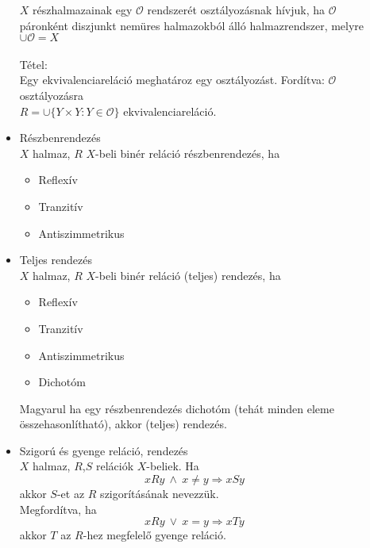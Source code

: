 \documentclass[margin=0px]{article}
\begin{document}
\begin{description}
\begin{itemize}
                  $X$ részhalmazainak egy $\mathcal{O}$ rendszerét osztályozásnak hívjuk, ha $\mathcal{O}$ páronként diszjunkt nemüres halmazokból álló halmazrendszer, melyre $\cup\mathcal{O} = X$
                  \\\\
                  Tétel: \\
                  Egy ekvivalenciareláció meghatároz egy osztályozást. Fordítva: $\mathcal{O}$ osztályozásra \\ ${R = \cup\{Y\times Y : Y \in \mathcal{O} \}}$ ekvivalenciareláció.

            \item Részbenrendezés\\
                  $X$ halmaz, $R$ $X$-beli binér reláció részbenrendezés, ha
                  \begin{itemize}
                      \item Reflexív
                      \item Tranzitív
                      \item Antiszimmetrikus
                  \end{itemize}
            \item Teljes rendezés \\
                  $X$ halmaz, $R$ $X$-beli binér reláció (teljes) rendezés, ha
                  \begin{itemize}
                      \item Reflexív
                      \item Tranzitív
                      \item Antiszimmetrikus
                      \item Dichotóm
                  \end{itemize}
                  Magyarul ha egy részbenrendezés dichotóm (tehát minden eleme összehasonlítható), akkor (teljes) rendezés.
            \item Szigorú és gyenge reláció, rendezés \\
                  $X$ halmaz, $R$,$S$ relációk $X$-beliek. Ha
                  \[ xRy \ \land \ x \neq y \Rightarrow xSy\]
                  akkor $S$-et az $R$ szigorításának nevezzük.\\
                  Megfordítva, ha
                  \[  xRy \ \lor \ x = y \Rightarrow xTy \]
                  akkor $T$ az $R$-hez megfelelő gyenge reláció.\\


\end{itemize}
\end{description}
\end{document}
